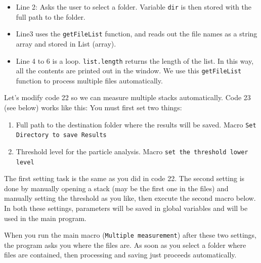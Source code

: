 \documentclass[11pt,a4paper,oneside]{report}
\newcommand{\ilcom}[1]{\texttt{\small#1}}
\begin{document}
\begin{itemize}
\item Line 2: Asks the user to select a folder. Variable \ilcom{dir} is then stored with the full path to the folder. 
\item Line3 uses the \ilcom{getFileList} function, and reads out the file names as a string array and stored in List (array). 
\item Line 4 to 6 is a loop. \ilcom{list.length} returns the length of the list. In this way, all the contents are printed out in the window. 
We use this \ilcom{getFileList} function to process multiple files automatically. 
\end{itemize}

Let's modify code 22 so we can measure multiple stacks automatically. Code 23 (see below) works like this: You must first set two things: 

\begin{enumerate}
\item Full path to the destination folder where the results will be saved. 
Macro \ilcom{Set Directory to save Results}
\item Threshold level for the particle analysis. Macro \ilcom{set the threshold lower level}
\end{enumerate}

The first setting task is the same as you did in code 22. 
The second setting is done by manually opening a stack 
(may be the first one in the files) and manually setting the threshold as you like, 
then execute the second macro below. In both these settings, 
parameters will be saved in global variables and will be used in the main program. 

When you run the main macro (\ilcom{Multiple measurement}) 
after these two settings, the program asks you where the files are. 
As soon as you select a folder where files are contained, 
then processing and saving just proceeds automatically. 


\end{document}
